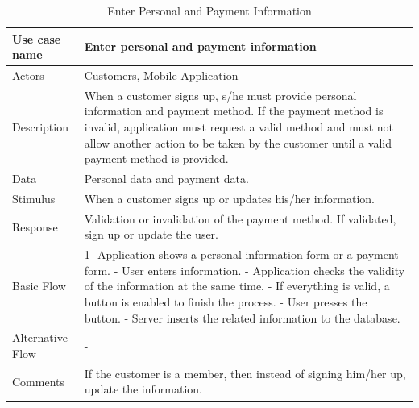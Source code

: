 \documentclass[11pt]{article}
\begin{document}
        \begin{table}[H]
        \begin{centering}        
        \begin{tabular}{|p{2.5cm}|p{12cm}|}
        \hline
        Use case name & Enter personal and payment information  \\ \hline
        Actors        & Customers, Mobile Application  \\ \hline
        Description   & When a customer signs up, s/he must provide personal 
                        information and payment method. If the payment method is invalid, application must request a valid method and must not allow another action to be taken by the customer until a valid payment method is provided.  \\ \hline
        Data          & Personal data and payment data.  \\ \hline
        Stimulus      & When a customer signs up or updates his/her information. \\ \hline
        Response      & Validation or invalidation of the payment method. If validated, sign up or update the user. \\ \hline
        Basic Flow    & 
        1- Application shows a personal information form or a payment form. \newline
        2- User enters information. \newline
        3- Application checks the validity of the information at the same time. \newline
        4- If everything is valid, a button is enabled to finish the process. \newline
        5- User presses the button. \newline
        6- Server inserts the related information to the database. \\ \hline
        Alternative
            Flow      & - \\ \hline
        Comments      & If the customer is a member, then instead of signing him/her up, update the information. \\ \hline
        
        \end{tabular}
        \caption{Enter Personal and Payment Information}
        \label{tab5}
        \end{centering}
        \end{table}    
        
        
        
\end{document}
